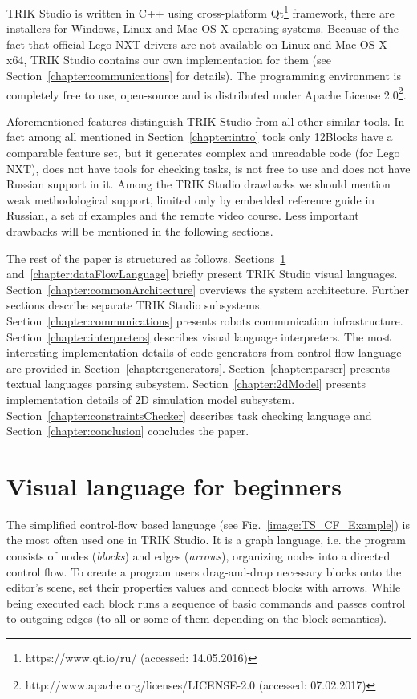 \documentclass[conference]{IEEEtran}
\begin{document}
TRIK Studio is written in C++ using cross-platform Qt\footnote{https://www.qt.io/ru/ (accessed: 14.05.2016)} framework, there are installers for Windows, Linux and Mac OS X operating systems. Because of the fact that official Lego NXT drivers are not available on Linux and Mac OS X x64, TRIK Studio contains our own implementation for them (see Section~\ref{chapter:communications} for details). The programming environment is completely free to use, open-source and is distributed under Apache License 2.0\footnote{http://www.apache.org/licenses/LICENSE-2.0 (accessed: 07.02.2017)}.

Aforementioned features distinguish TRIK Studio from all other similar tools. In fact among all mentioned in Section~\ref{chapter:intro} tools only 12Blocks have a comparable feature set, but it generates complex and unreadable code (for Lego NXT), does not have tools for checking tasks, is not free to use and does not have Russian support in it. Among the TRIK Studio drawbacks we should mention weak methodological support, limited only by embedded reference guide in Russian, a set of examples and the remote video course. Less important drawbacks will be mentioned in the following sections. 

The rest of the paper is structured as follows. Sections~\ref{chapter:controlFlowLanguage} and~\ref{chapter:dataFlowLanguage} briefly present TRIK Studio visual languages. Section~\ref{chapter:commonArchitecture} overviews the system architecture. Further sections describe separate TRIK Studio subsystems. Section~\ref{chapter:communications} presents robots communication infrastructure. Section~\ref{chapter:interpreters} describes visual language interpreters. The most interesting implementation details of code generators from control-flow language are provided in Section~\ref{chapter:generators}. Section~\ref{chapter:parser} presents textual languages parsing subsystem. Section~\ref{chapter:2dModel} presents implementation details of 2D simulation model subsystem. Section~\ref{chapter:constraintsChecker} describes task checking language and Section~\ref{chapter:conclusion} concludes the paper.

\section{Visual language for beginners}
\label{chapter:controlFlowLanguage}

The simplified control-flow based language (see Fig.~\ref{image:TS_CF_Example}) is the most often used one in TRIK Studio. It is a graph language, i.e. the program consists of nodes (\textit{blocks}) and edges (\textit{arrows}), organizing nodes into a directed control flow. To create a program users drag-and-drop necessary blocks onto the editor's scene, set their properties values and connect blocks with arrows. While being executed each block runs a sequence of basic commands and passes control to outgoing edges (to all or some of them depending on the block semantics). 
\end{document}

